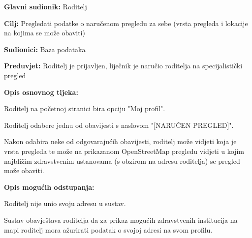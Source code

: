 						\noindent {}
					\begin{packed_item}
						
						\item \textbf{Glavni sudionik: }Roditelj
						\item  \textbf{Cilj:} Pregledati podatke o naručenom pregledu za sebe (vrsta pregleda i lokacije na kojima se može obaviti)
						\item  \textbf{Sudionici:} Baza podataka
						\item  \textbf{Preduvjet:} Roditelj je prijavljen, liječnik je naručio roditelja na specijalistički pregled
						\item  \textbf{Opis osnovnog tijeka:}
						
						\item[] \begin{packed_enum}
							
							\item Roditelj na početnoj stranici bira opciju "Moj profil".
							\item Roditelj odabere jednu od obavijesti s naslovom "[NARUČEN PREGLED]".
							\item Nakon odabira neke od odgovarajućih obavijesti, roditelj može vidjeti koja je vrsta pregleda te može na prikazanom OpenStreetMap pregledu vidjeti u kojim najbližim zdravstvenim ustanovama (s obzirom na adresu roditelja) se pregled može obaviti.
						\end{packed_enum}
						
						\item  \textbf{Opis mogućih odstupanja:}
						
						\item[] \begin{packed_item}
							
							\item[3.a] Roditelj nije unio svoju adresu u sustav.
							\item[] \begin{packed_enum}
								
								\item Sustav obavještava roditelja da za prikaz mogućih zdravstvenih institucija na mapi roditelj mora ažurirati podatak o svojoj adresi na svom profilu.
							\end{packed_enum}
							
							
						\end{packed_item}
					\end{packed_item}
					
